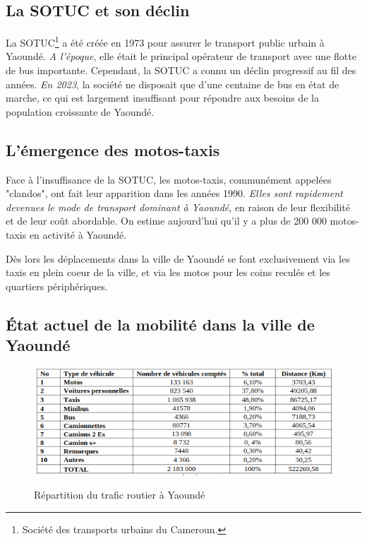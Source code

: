 \subsection{La SOTUC et son déclin}

La SOTUC\footnote{Société des transports urbains du Cameroun.
} a été créée en 1973 pour assurer le transport public urbain à Yaoundé. \emph{A l'époque}, elle était le principal opérateur de transport avec une flotte de bus importante. Cependant, la SOTUC a connu un déclin progressif au fil des années. \emph{En 2023}, la société ne disposait que d'une centaine de bus en état de marche, ce qui est largement insuffisant pour répondre aux besoins de la population croissante de Yaoundé.

\subsection{L'émergence des motos-taxis}

Face à l'insuffisance de la SOTUC, les motos-taxis, communément appelées "clandos", ont fait leur apparition dans les années 1990. \emph{Elles sont rapidement devenues le mode de transport dominant à Yaoundé}, en raison de leur flexibilité et de leur coût abordable. On estime aujourd'hui qu'il y a plus de 200 000 motos-taxis en activité à Yaoundé.

Dès lors les déplacements dans la ville de Yaoundé se font exclusivement via les taxis en plein coeur de la ville, et via les motos pour les coins reculés et les quartiers périphériques.

\subsection{État actuel de la mobilité dans la ville de Yaoundé}

\begin{figure}[h]
    \centering
    \includegraphics[width=0.8\linewidth]{Images/Repartition_Trafic_Par_Vehicule.png}
    \caption{Répartition du trafic routier à Yaoundé}
    \label{fig:repartition_trafic}
    \cite{mfoulou2016mobilite}
\end{figure}


